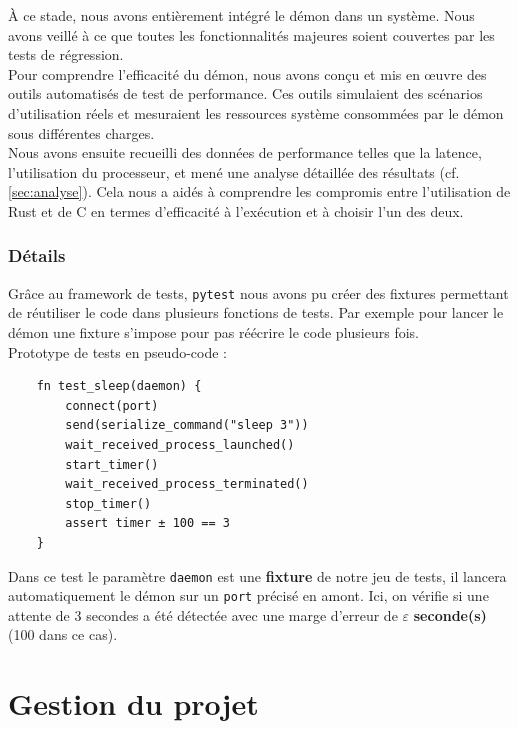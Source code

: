 \documentclass{article}
\begin{document}
À ce stade, nous avons entièrement intégré le démon dans un système. Nous avons veillé à ce que toutes les fonctionnalités majeures soient couvertes par les tests de régression.\\

Pour comprendre l’efficacité du démon, nous avons conçu et mis en œuvre des outils automatisés de test de performance. Ces outils simulaient des scénarios d’utilisation réels et mesuraient les ressources système consommées par le démon sous différentes charges.\\

Nous avons ensuite recueilli des données de performance telles que la latence, l’utilisation du processeur, et mené une analyse détaillée des résultats (cf. \ref{sec:analyse}). Cela nous a aidés à comprendre les compromis entre l'utilisation de Rust et de C en termes d’efficacité à l'exécution et à choisir l’un des deux.

\subsubsection{Détails}

Grâce au framework de tests, \texttt{pytest} nous avons pu créer des fixtures permettant de réutiliser le code dans plusieurs fonctions de tests. Par exemple pour lancer le démon une fixture s'impose pour pas réécrire le code plusieurs fois.\\

Prototype de tests en pseudo-code : 

\begin{verbatim}
    fn test_sleep(daemon) {
        connect(port)
        send(serialize_command("sleep 3"))
        wait_received_process_launched()
        start_timer()
        wait_received_process_terminated()
        stop_timer()
        assert timer ± 100 == 3
    }
\end{verbatim}

Dans ce test le paramètre \texttt{daemon} est une \textbf{fixture} de notre jeu de tests, il lancera automatiquement le démon sur un \texttt{port} précisé en amont. Ici, on vérifie si une attente de 3 secondes a été détectée avec une marge d’erreur de $\varepsilon$ \textbf{seconde(s)} (100 dans ce cas).


\section{Gestion du projet}
\end{document}
